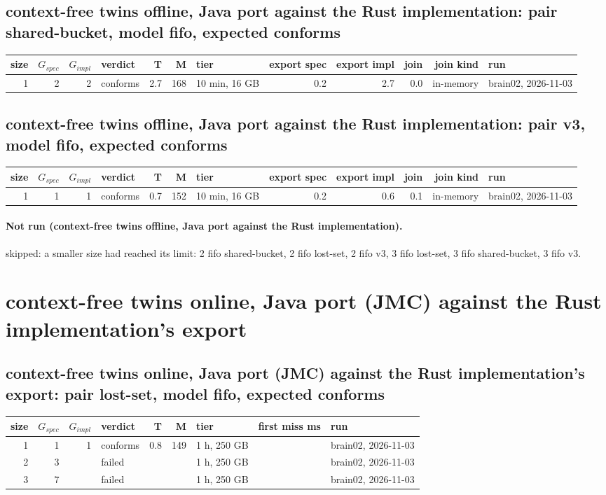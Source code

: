 \documentclass[10pt]{article}
\begin{document}
\subsection*{context-free twins offline, Java port against the Rust implementation: pair \textsf{shared-bucket}, model fifo, expected conforms}
\begin{longtable}{@{}rrrlrrlrrrrl@{}}
\toprule
size & $G_{\mathit{spec}}$ & $G_{\mathit{impl}}$ & verdict & T & M & tier & export spec & export impl & join & join kind & run \\
\midrule
\endhead
\color{red} 1 & 2 & 2 & conforms & 2.7 & 168 & 10 min, 16 GB & 0.2 & 2.7 & 0.0 & in-memory & brain02, 2026-11-03 \\
\bottomrule
\end{longtable}
\subsection*{context-free twins offline, Java port against the Rust implementation: pair \textsf{v3}, model fifo, expected conforms}
\begin{longtable}{@{}rrrlrrlrrrrl@{}}
\toprule
size & $G_{\mathit{spec}}$ & $G_{\mathit{impl}}$ & verdict & T & M & tier & export spec & export impl & join & join kind & run \\
\midrule
\endhead
\color{red} 1 & 1 & 1 & conforms & 0.7 & 152 & 10 min, 16 GB & 0.2 & 0.6 & 0.1 & in-memory & brain02, 2026-11-03 \\
\bottomrule
\end{longtable}
\paragraph{Not run (context-free twins offline, Java port against the Rust implementation).}
skipped: a smaller size had reached its limit: 2 fifo shared-bucket, 2 fifo lost-set, 2 fifo v3, 3 fifo lost-set, 3 fifo shared-bucket, 3 fifo v3.\par
\section*{context-free twins online, Java port (JMC) against the Rust implementation's export}
\subsection*{context-free twins online, Java port (JMC) against the Rust implementation's export: pair \textsf{lost-set}, model fifo, expected conforms}
\begin{longtable}{@{}rrrlrrlrl@{}}
\toprule
size & $G_{\mathit{spec}}$ & $G_{\mathit{impl}}$ & verdict & T & M & tier & first miss ms & run \\
\midrule
\endhead
\color{red} 1 & 1 & 1 & conforms & 0.8 & 149 & 1 h, 250 GB &  & brain02, 2026-11-03 \\
\color{blue} 2 & 3 &  & failed &  &  & 1 h, 250 GB &  & brain02, 2026-11-03 \\
\color{blue} 3 & 7 &  & failed &  &  & 1 h, 250 GB &  & brain02, 2026-11-03 \\
\bottomrule
\end{longtable}
\end{document}
